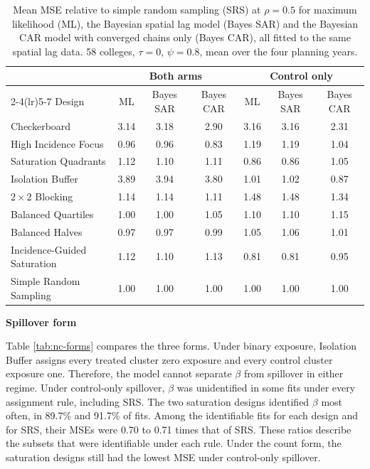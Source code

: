 \documentclass[11pt]{article}
\newcommand{\sihead}[1]{\par\medskip\noindent\textbf{#1}\par\nopagebreak\noindent\ignorespaces}
\begin{document}
\iffullsi
\begin{table}[!htb]
\small
\centering
\caption{Mean MSE relative to simple random sampling (SRS) at $\rho = 0.5$ for maximum likelihood (ML), the Bayesian spatial lag model (Bayes SAR) and the Bayesian CAR model with converged chains only (Bayes CAR), all fitted to the same spatial lag data. 58 colleges, $\tau = 0$, $\psi = 0.8$, mean over the four planning years.}
\label{tab:nc-bayes}
\begin{tabular}{lcccccc}
\toprule
& \multicolumn{3}{c}{Both arms} & \multicolumn{3}{c}{Control only} \\
\cmidrule(lr){2-4}\cmidrule(lr){5-7}
Design & ML & Bayes SAR & Bayes CAR & ML & Bayes SAR & Bayes CAR \\
\midrule
Checkerboard & 3.14 & 3.18 & 2.90 & 3.16 & 3.16 & 2.31 \\
High Incidence Focus & 0.96 & 0.96 & 0.83 & 1.19 & 1.19 & 1.04 \\
Saturation Quadrants & 1.12 & 1.10 & 1.11 & 0.86 & 0.86 & 1.05 \\
Isolation Buffer & 3.89 & 3.94 & 3.80 & 1.01 & 1.02 & 0.87 \\
$2\times2$ Blocking & 1.14 & 1.14 & 1.11 & 1.48 & 1.48 & 1.34 \\
Balanced Quartiles & 1.00 & 1.00 & 1.05 & 1.10 & 1.10 & 1.15 \\
Balanced Halves & 0.97 & 0.97 & 0.99 & 1.05 & 1.06 & 1.01 \\
Incidence-Guided Saturation & 1.12 & 1.10 & 1.13 & 0.81 & 0.81 & 0.95 \\
Simple Random Sampling & 1.00 & 1.00 & 1.00 & 1.00 & 1.00 & 1.00 \\
\bottomrule
\end{tabular}
\end{table}
\fi

\sihead{Spillover form}
Table \ref{tab:nc-forms} compares the three
forms. Under binary exposure, Isolation Buffer assigns every treated
cluster zero exposure and every control cluster exposure one. Therefore, the
model cannot separate $\beta$ from spillover in either regime. Under
control-only spillover, $\beta$ was unidentified in some fits under
every assignment rule, including SRS. The two saturation designs
identified $\beta$ most often, in 89.7\% and 91.7\% of fits. Among
the identifiable fits for each design and for SRS, their MSEs were
0.70 to 0.71 times that of SRS. These ratios describe the subsets that
were identifiable under each rule. Under the count form, the
saturation designs still had the lowest MSE under control-only spillover.
\end{document}
